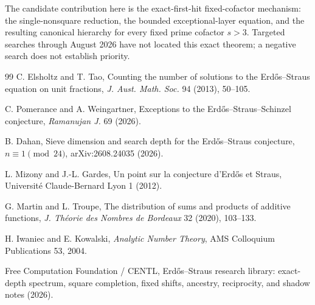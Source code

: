 \documentclass[11pt]{article}
\theoremstyle{definition}
\begin{document}
The candidate contribution here is the exact-first-hit fixed-cofactor mechanism: the single-nonsquare reduction, the bounded exceptional-layer equation, and the resulting canonical hierarchy for every fixed prime cofactor $s>3$. Targeted searches through August 2026 have not located this exact theorem; a negative search does not establish priority.

\begin{thebibliography}{99}
C. Elsholtz and T. Tao,
Counting the number of solutions to the Erd\H{o}s--Straus equation on unit fractions,
\emph{J. Aust. Math. Soc.} 94 (2013), 50--105.

C. Pomerance and A. Weingartner,
Exceptions to the Erd\H{o}s--Straus--Schinzel conjecture,
\emph{Ramanujan J.} 69 (2026).

B. Dahan,
Sieve dimension and search depth for the Erd\H{o}s--Straus conjecture, $n\equiv1\pmod{24}$,
arXiv:2608.24035 (2026).

L. Mizony and J.-L. Gardes,
Un point sur la conjecture d'Erd\H{o}s et Straus,
Universit\'e Claude-Bernard Lyon 1 (2012).

G. Martin and L. Troupe,
The distribution of sums and products of additive functions,
\emph{J. Th\'eorie des Nombres de Bordeaux} 32 (2020), 103--133.

H. Iwaniec and E. Kowalski,
\emph{Analytic Number Theory},
AMS Colloquium Publications 53, 2004.

Free Computation Foundation / CENTL,
Erd\H{o}s--Straus research library: exact-depth spectrum, square completion, fixed shifts, ancestry, reciprocity, and shadow notes (2026).
\end{thebibliography}
\end{document}
